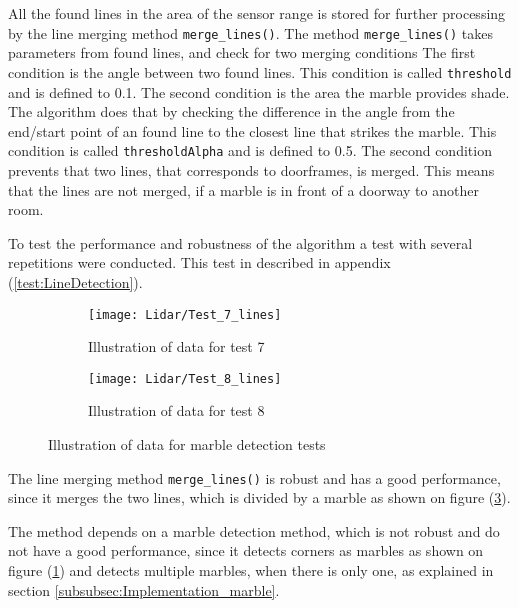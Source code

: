 \documentclass[../Head/Main.tex]{subfiles}
\begin{document}
All the found lines in the area of the sensor range is stored for further processing by the line merging method \texttt{merge\_lines()}.
The method \texttt{merge\_lines()} takes parameters from found lines, and check for two merging conditions The first condition is the angle between two found lines. This condition is called \texttt{threshold} and is defined to 0.1. The second condition is the area the marble provides shade. The algorithm does that by checking the difference in the angle from the end/start point of an found line to the closest line that strikes the marble. This condition is called \texttt{thresholdAlpha} and is defined to 0.5. The second condition prevents that two lines, that corresponds to doorframes, is merged. This means that the lines are not merged, if a marble is in front of a doorway to another room.\par
To test the performance and robustness of the algorithm a  test with several repetitions were conducted. This test in described in appendix (\ref{test:LineDetection}).
\begin{figure}[H]
  \begin{subfigure}[b]{0.5\textwidth}
  	\centering
    \texttt{[image: Lidar/Test\_7\_lines]}
    \caption{Illustration of data for test 7}
    \label{fig:LineTest7}
  \end{subfigure}
  \hfill
  \begin{subfigure}[b]{0.5\textwidth}
  	\centering
    \texttt{[image: Lidar/Test\_8\_lines]}
    \caption{Illustration of data for test 8}
    \label{fig:LineTest8}
  \end{subfigure}
  \caption{Illustration of data for marble detection tests}
\end{figure}
The line merging method \texttt{merge\_lines()} is robust and has a good performance, since it merges the two lines, which is divided by a marble as shown on figure (\ref{fig:LineTest8}). \par
The method depends on a marble detection method, which is not robust and do not have a good performance, since it detects corners as marbles as shown on figure (\ref{fig:LineTest7}) and detects multiple marbles, when there is only one, as explained in section \ref{subsubsec:Implementation_marble}.
\end{document}
